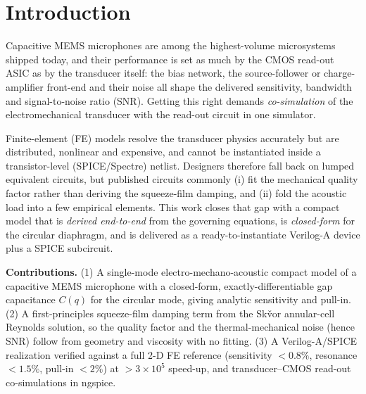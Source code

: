 \documentclass[conference]{IEEEtran}
\begin{document}
\section{Introduction}
Capacitive MEMS microphones are among the highest-volume microsystems shipped
today, and their performance is set as much by the CMOS read-out ASIC as by the
transducer itself: the bias network, the source-follower or charge-amplifier
front-end and their noise all shape the delivered sensitivity, bandwidth and
signal-to-noise ratio (SNR). Getting this right demands \emph{co-simulation} of
the electromechanical transducer with the read-out circuit in one simulator.

Finite-element (FE) models resolve the transducer physics accurately but are
distributed, nonlinear and expensive, and cannot be instantiated inside a
transistor-level (SPICE/Spectre) netlist. Designers therefore fall back on
lumped equivalent circuits, but published circuits commonly (i) fit the
mechanical quality factor rather than deriving the squeeze-film damping, and
(ii) fold the acoustic load into a few empirical elements. This work closes that
gap with a compact model that is \emph{derived end-to-end} from the governing
equations, is \emph{closed-form} for the circular diaphragm, and is delivered as
a ready-to-instantiate Verilog-A device plus a SPICE subcircuit.

\textbf{Contributions.}
(1) A single-mode electro-mechano-acoustic compact model of a capacitive MEMS
microphone with a closed-form, exactly-differentiable gap capacitance
$C(q)$ for the circular mode, giving analytic sensitivity and pull-in.
(2) A first-principles squeeze-film damping term from the Sk\v{v}or annular-cell
Reynolds solution, so the quality factor and the thermal-mechanical noise (hence
SNR) follow from geometry and viscosity with no fitting.
(3) A Verilog-A/SPICE realization verified against a full 2-D FE reference
(sensitivity $<0.8\%$, resonance $<1.5\%$, pull-in $<2\%$) at $>3\times10^{5}$
speed-up, and transducer--CMOS read-out co-simulations in ngspice.
\end{document}
